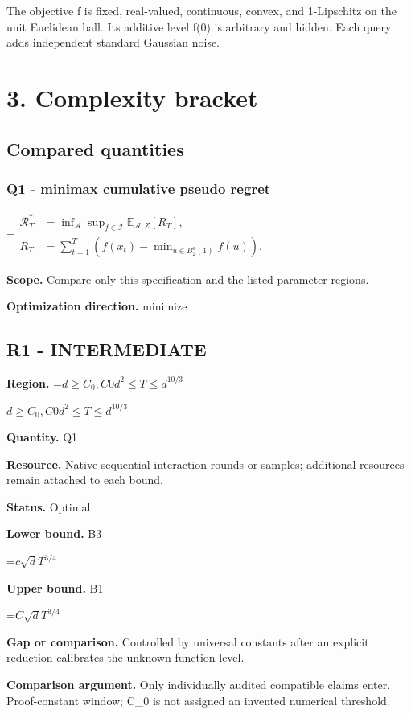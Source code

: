 \documentclass[10pt,a4paper]{article}
\newcommand{\AtlasMath}[1]{\par\begingroup\centering\setbox0=\hbox{$\displaystyle #1$}\ifdim\wd0>1.4\linewidth\typeout{ATLAS WIDE FORMULA: \the\wd0}\fi\ifdim\wd0>\linewidth\resizebox{\linewidth}{!}{\box0}\else\box0\fi\par\endgroup}
\newcommand{\AtlasInlineMath}[1]{\begingroup\setbox0=\hbox{$#1$}\ifdim\wd0>.4\linewidth\endgroup\AtlasMath{#1}\else\endgroup$#1$\fi}
\begin{document}
The objective f is fixed, real-valued, continuous, convex, and 1-Lipschitz on the unit Euclidean ball. Its additive level f(0) is arbitrary and hidden. Each query adds independent standard Gaussian noise.

\section{3. Complexity bracket}
\subsection{Compared quantities}
\subsubsection{Q1 - minimax cumulative pseudo regret}
\AtlasMath{\begin{aligned}\mathcal R_T^*&=\inf_{\mathcal A}\sup_{f\in\mathcal I}\mathbb E_{\mathcal A,Z}[R_T],\\ R_T&=\sum_{t=1}^T\left(f(x_t)-\min_{u\in B_2^d(1)}f(u)\right).\end{aligned}}
\textbf{Scope.} Compare only this specification and the listed parameter regions.

\textbf{Optimization direction.} minimize

\subsection{R1 - INTERMEDIATE}
\textbf{Region.} \AtlasInlineMath{d\ge C_0, C0d^2\le T\le d^{10/3}}

\textbf{Quantity.} Q1

\textbf{Resource.} Native sequential interaction rounds or samples; additional resources remain attached to each bound.

\textbf{Status.} Optimal

\textbf{Lower bound.} B3

\AtlasMath{c \sqrt{d}T^{3/4}}
\textbf{Upper bound.} B1

\AtlasMath{C \sqrt{d} T^{3/4}}
\textbf{Gap or comparison.} Controlled by universal constants after an explicit reduction calibrates the unknown function level.

\textbf{Comparison argument.} Only individually audited compatible claims enter. Proof-constant window; C\_0 is not assigned an invented numerical threshold.
\end{document}
